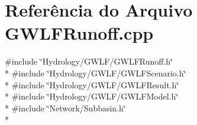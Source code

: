 \section{Referência do Arquivo G\+W\+L\+F\+Runoff.\+cpp}
\label{_g_w_l_f_runoff_8cpp}
{\ttfamily \#include \char`\"{}Hydrology/\+G\+W\+L\+F/\+G\+W\+L\+F\+Runoff.\+h\char`\"{}}\\*
{\ttfamily \#include \char`\"{}Hydrology/\+G\+W\+L\+F/\+G\+W\+L\+F\+Scenario.\+h\char`\"{}}\\*
{\ttfamily \#include \char`\"{}Hydrology/\+G\+W\+L\+F/\+G\+W\+L\+F\+Result.\+h\char`\"{}}\\*
{\ttfamily \#include \char`\"{}Hydrology/\+G\+W\+L\+F/\+G\+W\+L\+F\+Model.\+h\char`\"{}}\\*
{\ttfamily \#include \char`\"{}Network/\+Subbasin.\+h\char`\"{}}\\*
